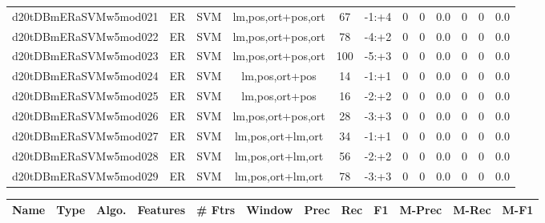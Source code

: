 \documentclass[a4paper]{article}
\begin{document}
\begin{landscape}
\begin{center}
\begin{tabular}{ |c|c|c|c|c|c|c|c|c|c|c|c|}
 
 	
 	\small{ d20tDBmERaSVMw5mod021 } & ER & SVM & lm,pos,ort+pos,ort  &  67 &  -1:+4  &  0 & 0 & 0.0  &  0 & 0 & 0.0 \\
 	

 
 	
 	\small{ d20tDBmERaSVMw5mod022 } & ER & SVM & lm,pos,ort+pos,ort  &  78 &  -4:+2  &  0 & 0 & 0.0  &  0 & 0 & 0.0 \\
 	

 
 	
 	\small{ d20tDBmERaSVMw5mod023 } & ER & SVM & lm,pos,ort+pos,ort  &  100 &  -5:+3  &  0 & 0 & 0.0  &  0 & 0 & 0.0 \\
 	

 
 	
 	\small{ d20tDBmERaSVMw5mod024 } & ER & SVM & lm,pos,ort+pos  &  14 &  -1:+1  &  0 & 0 & 0.0  &  0 & 0 & 0.0 \\
 	

 
 	
 	\small{ d20tDBmERaSVMw5mod025 } & ER & SVM & lm,pos,ort+pos  &  16 &  -2:+2  &  0 & 0 & 0.0  &  0 & 0 & 0.0 \\
 	

 
 	
 	\small{ d20tDBmERaSVMw5mod026 } & ER & SVM & lm,pos,ort+pos,ort  &  28 &  -3:+3  &  0 & 0 & 0.0  &  0 & 0 & 0.0 \\
 	

 
 	
 	\small{ d20tDBmERaSVMw5mod027 } & ER & SVM & lm,pos,ort+lm,ort  &  34 &  -1:+1  &  0 & 0 & 0.0  &  0 & 0 & 0.0 \\
 	

 
 	
 	\small{ d20tDBmERaSVMw5mod028 } & ER & SVM & lm,pos,ort+lm,ort  &  56 &  -2:+2  &  0 & 0 & 0.0  &  0 & 0 & 0.0 \\
 	

 
 	
 	\small{ d20tDBmERaSVMw5mod029 } & ER & SVM & lm,pos,ort+lm,ort  &  78 &  -3:+3  &  0 & 0 & 0.0  &  0 & 0 & 0.0 \\
 	
 \hline
\end{tabular}
\end{center}




\begin{center}
\begin{tabular}{ |c|c|c|c|c|c|c|c|c|c|c|c|} 
 \hline
 	Name & Type & Algo. & Features & \# Ftrs & Window & Prec & Rec & F1 & M-Prec & M-Rec & M-F1\\
 \hline


\end{tabular}
\end{center}
\end{landscape}
\end{document}
